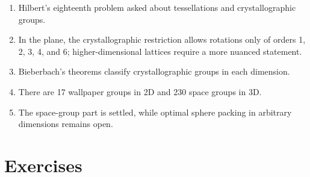 \begin{enumerate}
    \item Hilbert's eighteenth problem asked about tessellations and crystallographic groups.
    \item In the plane, the crystallographic restriction allows rotations only of orders 1, 2, 3, 4, and 6; higher-dimensional lattices require a more nuanced statement.
    \item Bieberbach's theorems classify crystallographic groups in each dimension.
    \item There are 17 wallpaper groups in 2D and 230 space groups in 3D.
    \item The space-group part is settled, while optimal sphere packing in arbitrary dimensions remains open.
\end{enumerate}

\section*{Exercises}

